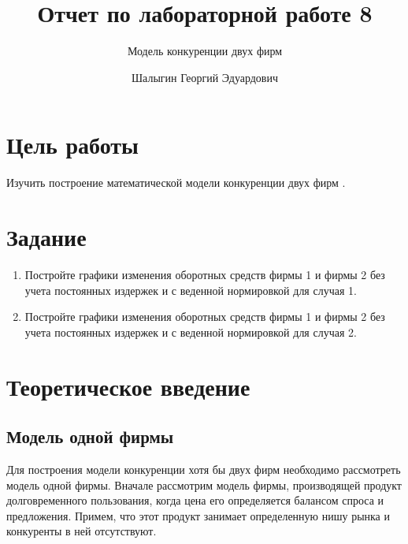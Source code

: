 \documentclass[
  12pt,
  a4paper,
]{scrreprt}
\title{Отчет по лабораторной работе 8}
\subtitle{Модель конкуренции двух фирм}
\author{Шалыгин Георгий Эдуардович}
\date{}
\providecommand{\tightlist}{%
  \setlength{\itemsep}{0pt}\setlength{\parskip}{0pt}}
\begin{document}
\maketitle

\renewcommand*\contentsname{Содержание}
{
\setcounter{tocdepth}{2}
\tableofcontents
}
\listoffigures
\listoftables
{}
\hypertarget{ux446ux435ux43bux44c-ux440ux430ux431ux43eux442ux44b}{%
\chapter{Цель
работы}\label{ux446ux435ux43bux44c-ux440ux430ux431ux43eux442ux44b}}

Изучить построение математической модели конкуренции двух фирм .

\hypertarget{ux437ux430ux434ux430ux43dux438ux435}{%
\chapter{Задание}\label{ux437ux430ux434ux430ux43dux438ux435}}

\begin{enumerate}
\def\labelenumi{\arabic{enumi}.}
\tightlist
\item
  Постройте графики изменения оборотных средств фирмы 1 и фирмы 2 без
  учета постоянных издержек и с веденной нормировкой для случая 1.
\item
  Постройте графики изменения оборотных средств фирмы 1 и фирмы 2 без
  учета постоянных издержек и с веденной нормировкой для случая 2.
\end{enumerate}

\hypertarget{ux442ux435ux43eux440ux435ux442ux438ux447ux435ux441ux43aux43eux435-ux432ux432ux435ux434ux435ux43dux438ux435}{%
\chapter{Теоретическое
введение}\label{ux442ux435ux43eux440ux435ux442ux438ux447ux435ux441ux43aux43eux435-ux432ux432ux435ux434ux435ux43dux438ux435}}

\hypertarget{ux43cux43eux434ux435ux43bux44c-ux43eux434ux43dux43eux439-ux444ux438ux440ux43cux44b}{%
\section{Модель одной
фирмы}\label{ux43cux43eux434ux435ux43bux44c-ux43eux434ux43dux43eux439-ux444ux438ux440ux43cux44b}}

Для построения модели конкуренции хотя бы двух фирм необходимо
рассмотреть модель одной фирмы. Вначале рассмотрим модель фирмы,
производящей продукт долговременного пользования, когда цена его
определяется балансом спроса и предложения. Примем, что этот продукт
занимает определенную нишу рынка и конкуренты в ней отсутствуют.
\end{document}

